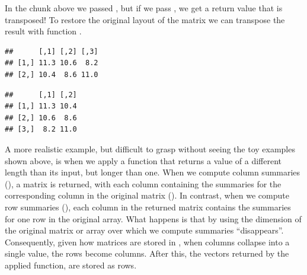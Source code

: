 \documentclass[krantz2]{krantz}\usepackage{knitr}%
\begin{document}
In the chunk above we passed , but if we pass , we get a return value that is transposed! To restore the original layout of the matrix we can transpose the result with function .

\begin{knitrout}\footnotesize
{}\color{fgcolor}\begin{kframe}
\begin{alltt}
 \hlkwb{<-} \hlstd{(}   \hlstd{=} \hlstd{,}  
\end{alltt}
\begin{verbatim}
##      [,1] [,2] [,3]
## [1,] 11.3 10.6  8.2
## [2,] 10.4  8.6 11.0
\end{verbatim}
\begin{alltt}
\end{alltt}
\begin{verbatim}
##      [,1] [,2]
## [1,] 11.3 10.4
## [2,] 10.6  8.6
## [3,]  8.2 11.0
\end{verbatim}
\end{kframe}
\end{knitrout}

A more realistic example, but difficult to grasp without seeing the toy examples shown above, is when we apply a function that returns a value of a different length than its input, but longer than one. When we compute column summaries (), a matrix is returned, with each column containing the summaries for the corresponding column in the original matrix (). In contrast, when we compute row summaries (), each column in the returned matrix contains the summaries for one row in the original array. What happens is that by using  the dimension of the original matrix or array over which we compute summaries ``disappears''. Consequently, given how matrices are stored in \Rlang, when columns collapse into a single value, the rows become columns. After this, the vectors returned by the applied function, are stored as rows.

\begin{knitrout}\footnotesize
{}\color{fgcolor}\begin{kframe}
\begin{alltt}
 \hlkwb{<-} \hlstd{(}\hlstd{,}  \hlstd{=} \hlstd{) \{}
       \hlstd{(}      
    \hlstd{\}}
\end{alltt}
\end{kframe}
\end{knitrout}
\end{document}
